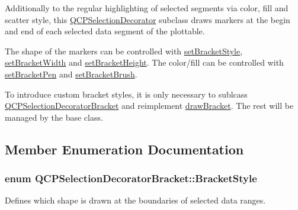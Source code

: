 Additionally to the regular highlighting of selected segments via color, fill and scatter style, this \hyperlink{classQCPSelectionDecorator}{Q\+C\+P\+Selection\+Decorator} subclass draws markers at the begin and end of each selected data segment of the plottable.

The shape of the markers can be controlled with \hyperlink{classQCPSelectionDecoratorBracket_a04507697438f6ad8cc2aeea5422dcbe5}{set\+Bracket\+Style}, \hyperlink{classQCPSelectionDecoratorBracket_a291b59cab98ce93a0a3c85963fe10f5e}{set\+Bracket\+Width} and \hyperlink{classQCPSelectionDecoratorBracket_aed773ad737201cca40efc6fe451acad8}{set\+Bracket\+Height}. The color/fill can be controlled with \hyperlink{classQCPSelectionDecoratorBracket_ac0e392a6097990f8aa978932a8fa05d6}{set\+Bracket\+Pen} and \hyperlink{classQCPSelectionDecoratorBracket_a2f4ea0bfb0ea980252b76dd349dd53aa}{set\+Bracket\+Brush}.

To introduce custom bracket styles, it is only necessary to sublcass \hyperlink{classQCPSelectionDecoratorBracket}{Q\+C\+P\+Selection\+Decorator\+Bracket} and reimplement \hyperlink{classQCPSelectionDecoratorBracket_a8153966498e2a8d4c11c681e06d7d692}{draw\+Bracket}. The rest will be managed by the base class. 

\subsection{Member Enumeration Documentation}
\subsubsection[{\texorpdfstring{Bracket\+Style}{BracketStyle}}]{\setlength{\rightskip}{0pt plus 5cm}enum {\bf Q\+C\+P\+Selection\+Decorator\+Bracket\+::\+Bracket\+Style}}\hypertarget{classQCPSelectionDecoratorBracket_aa6d18517ec0553575bbef0de4252336e}{}\label{classQCPSelectionDecoratorBracket_aa6d18517ec0553575bbef0de4252336e}
Defines which shape is drawn at the boundaries of selected data ranges.

